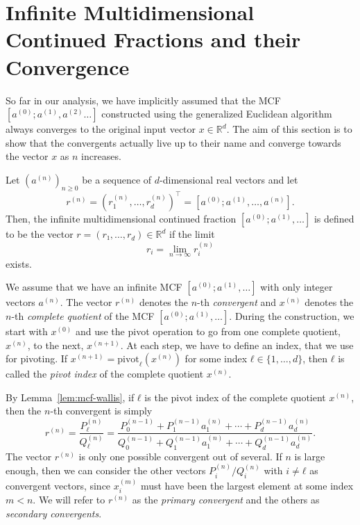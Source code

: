 \section{Infinite Multidimensional Continued Fractions and their Convergence}
\label{sec:mcf-convergence}

So far in our analysis, we have implicitly assumed that the MCF $[a^{(0)}; a^{(1)}, a^{(2)} …]$
constructed using the generalized Euclidean algorithm always converges to the
original input vector $x ∈ ℝ^d$.
The aim of this section is to show that the convergents actually live up to
their name and converge towards the vector $x$ as $n$ increases.

\begin{definition}
  Let $(a^{(n)})_{n ≥ 0}$ be a sequence of $d$-dimensional real vectors
  and let
  \[
    r^{(n)} = (r_1^{(n)}, …, r_d^{(n)})^⊤ = [a^{(0)}; a^{(1)}, …, a^{(n)}].
  \]
  Then, the infinite multidimensional continued fraction $[a^{(0)}; a^{(1)}, …]$ is defined to be
  the vector $r = (r₁, …, r_d) ∈ ℝ^d$ if the limit
  \[
    r_i = \lim_{n → ∞} r_i^{(n)}
  \]
  exists.
\end{definition}

We assume that we have an infinite MCF $[a^{(0)}; a^{(1)}, …]$
with only integer vectors $a^{(n)}$.
The vector $r^{(n)}$ denotes the $n$-th \emph{convergent}
and $x^{(n)}$ denotes the $n$-th \emph{complete quotient} of the MCF $[a^{(0)}; a^{(1)}, …]$.
During the construction, we start with $x^{(0)}$ and use the pivot operation to
go from one complete quotient, $x^{(n)}$, to the next, $x^{(n+1)}$.
At each step, we have to define an index, that we use for pivoting.
If $x^{(n+1)} = \mathrm{pivot}_ℓ(x^{(n)})$ for some index $ℓ ∈ \{1, …, d\}$,
then $ℓ$ is called the \emph{pivot index} of the complete quotient $x^{(n)}$.

By Lemma~\ref{lem:mcf-wallis},
if $ℓ$ is the pivot index of the complete quotient $x^{(n)}$,
then the $n$-th convergent is simply
\[
  r^{(n)}
  = \frac{P_ℓ^{(n)}}{Q_ℓ^{(n)}}
  = \frac{P_0^{(n-1)} + P_1^{(n-1)} a_1^{(n)} + ⋯ + P_d^{(n-1)} a_d^{(n)}}{Q_0^{(n-1)} + Q_1^{(n-1)} a_1^{(n)} + ⋯ + Q_d^{(n-1)} a_d^{(n)}}.
\]
The vector $r^{(n)}$ is only one possible convergent out of several.
If $n$ is large enough, then we can consider the other vectors
$P_i^{(n)}/Q_i^{(n)}$ with $i ≠ ℓ$ as convergent vectors,
since $x_i^{(m)}$ must have been the largest element at some index $m < n$.
We will refer to $r^{(n)}$ as the \emph{primary convergent} and the others as
\emph{secondary convergents}.

